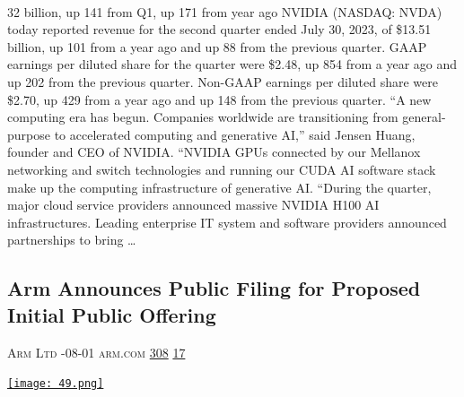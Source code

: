 \documentclass[10pt,a4paper]{article}
\begin{document}
\begin{multicols}{2}
\paragraph{}
32 billion, up 141 from Q1, up 171 from year ago
NVIDIA (NASDAQ: NVDA) today reported revenue for the second quarter ended July 30, 2023, of \$13.51 billion, up 101 from a year ago and up 88 from the previous quarter.
GAAP earnings per diluted share for the quarter were \$2.48, up 854 from a year ago and up 202 from the previous quarter. Non-GAAP earnings per diluted share were \$2.70, up 429 from a year ago and up 148 from the previous quarter.
“A new computing era has begun. Companies worldwide are transitioning from general-purpose to accelerated computing and generative AI,” said Jensen Huang, founder and CEO of NVIDIA.
“NVIDIA GPUs connected by our Mellanox networking and switch technologies and running our CUDA AI software stack make up the computing infrastructure of generative AI.
“During the quarter, major cloud service providers announced massive NVIDIA H100 AI infrastructures. Leading enterprise IT system and software providers announced partnerships to bring 
\dots\par
\noindent\begin{minipage}{\linewidth}
\medskip
\subsection{Arm Announces Public Filing for Proposed Initial Public Offering}
\textsc{\footnotesize
{\scriptsize\faUser}\space 
Arm Ltd 
{\scriptsize\faCalendar}-08-01 
{\scriptsize\faGlobe}\space 
arm.com 
{\scriptsize\faThumbsOUp}\space 
\href{http://news.ycombinator.com/item?id=37219779\&utm\_term=comment}{308} 
{\scriptsize\faComments}\space 
\href{http://news.ycombinator.com/item?id=37219779\&utm\_term=comment}{17} 
}
\par\medskip\noindent
\href{https://www.arm.com/company/news/2023/08/arm-announces-public-filing-of-registration-statement-for-proposed-initial-public-offering?utm\_source=hackernewsletter\&utm\_medium=email\&utm\_term=startup\_news}{
    \texttt{[image: 49.png]}
}
\end{minipage}

\end{multicols}
\end{document}
